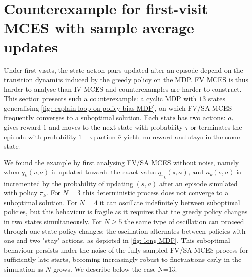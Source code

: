 \documentclass{article}
\begin{document}


\section{Counterexample for first-visit MCES with sample average updates}\label{sec:fv}

Under first-visits, the state-action pairs updated after an episode depend on the transition dynamics induced by the greedy policy on the MDP.
FV MCES is thus harder to analyse than IV MCES and counterexamples are harder to construct.
This section presents such a counterexample: a cyclic MDP with $13$ states
generalising \autoref{fig: explain loop on-policy bias MDP}, on which FV/SA MCES frequently converges to a suboptimal solution.
Each state has two actions:
$a_*$ gives reward $1$ and moves to the next state with probability $\tau$ or terminates the episode with probability $1-\tau$; action $\bar a$ yields no reward and stays in the same state.

%
% 

We found the example by first analysing FV/SA MCES without noise, namely when $q_k(s,a)$ is updated towards the exact value $q_{\pi_k}(s,a)$, and $n_k(s,a)$ is incremented by the probability of updating $(s,a)$ after an episode simulated with policy $\pi_k$.
For $N=3$ this deterministic process does not converge to a suboptimal solution. 
For $N=4$ it can oscillate indefinitely between suboptimal policies, but 
this behaviour is fragile as it requires that the greedy policy changes in two states simultaneously.
For $N \ge 5$ the same type of oscillation can proceed through one-state policy changes;  the oscillation alternates between policies with one and two "stay" actions, as depicted in \autoref{fig: long MDP}. 
This suboptimal behaviour persists under the noise of the fully sampled FV/SA MCES process for sufficiently late starts, becoming increasingly robust to fluctuations early in the simulation as $N$ grows. We describe below the case N=13.
\end{document}
